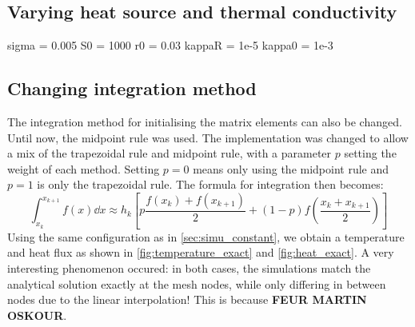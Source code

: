 \subsection{Varying heat source and thermal conductivity}


sigma = 0.005
S0 = 1000
r0 = 0.03
kappaR = 1e-5
kappa0 = 1e-3











\subsection{Changing integration method}

The integration method for initialising the matrix elements can also be changed. Until now, the midpoint rule was used. The implementation was changed to allow a mix of the trapezoidal rule and midpoint rule, with a parameter \(p\) setting the weight of each method. Setting \(p = 0\) means only using the midpoint rule and \(p = 1\) is only the trapezoidal rule. The formula for integration then becomes:
\begin{equation}
    \int_{x_k}^{x_{k+1}} f(x) \dd x \approx h_k \left[ p \frac{f(x_k) + f(x_{k+1})}{2} + (1-p) f \left( \frac{x_k + x_{k+1}}{2} \right) \right]
\end{equation}
Using the same configuration as in \autoref{sec:simu_constant}, we obtain a temperature and heat flux as shown in \autoref{fig:temperature_exact} and \autoref{fig:heat_exact}. A very interesting phenomenon occured: in both cases, the simulations match the analytical solution exactly at the mesh nodes, while only differing in between nodes due to the linear interpolation! This is because \textbf{FEUR MARTIN OSKOUR}.

